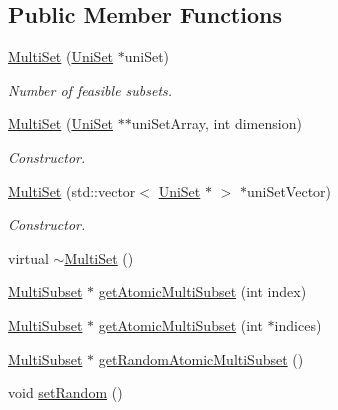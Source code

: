 \subsection*{Public Member Functions}
\begin{DoxyCompactItemize}
\item 
\hyperlink{classMultiSet_aa6ec2e2e6ef524acde12c795629f08c8}{Multi\-Set} (\hyperlink{classUniSet}{Uni\-Set} $\ast$uni\-Set)
\begin{DoxyCompactList}\small\item\em Number of feasible subsets. \end{DoxyCompactList}\item 
\hyperlink{classMultiSet_abafc2f4fb50484d3aabdd744dc1d6cc5}{Multi\-Set} (\hyperlink{classUniSet}{Uni\-Set} $\ast$$\ast$uni\-Set\-Array, int dimension)
\begin{DoxyCompactList}\small\item\em Constructor. \end{DoxyCompactList}\item 
\hyperlink{classMultiSet_ace92943f7461b6f683c7c4da76408e73}{Multi\-Set} (std\-::vector$<$ \hyperlink{classUniSet}{Uni\-Set} $\ast$ $>$ $\ast$uni\-Set\-Vector)
\begin{DoxyCompactList}\small\item\em Constructor. \end{DoxyCompactList}\item 
virtual \hyperlink{classMultiSet_a3ad638b1613083b97a53ea58e9060a4d}{$\sim$\-Multi\-Set} ()
\item 
\hyperlink{classMultiSubset}{Multi\-Subset} $\ast$ \hyperlink{classMultiSet_a48a6504163110d377db974d6ea5bd8fe}{get\-Atomic\-Multi\-Subset} (int index)
\item 
\hyperlink{classMultiSubset}{Multi\-Subset} $\ast$ \hyperlink{classMultiSet_a91d471ce84161187ab63f56199c74ab3}{get\-Atomic\-Multi\-Subset} (int $\ast$indices)
\item 
\hyperlink{classMultiSubset}{Multi\-Subset} $\ast$ \hyperlink{classMultiSet_afe3111c90692136b5141a4c5b96e2da3}{get\-Random\-Atomic\-Multi\-Subset} ()
\item 
\hypertarget{classMultiSet_aac2d5ee0afa30a8f565f29204a677cd9}{void \hyperlink{classMultiSet_aac2d5ee0afa30a8f565f29204a677cd9}{set\-Random} ()}\label{classMultiSet_aac2d5ee0afa30a8f565f29204a677cd9}


\end{DoxyCompactItemize}
